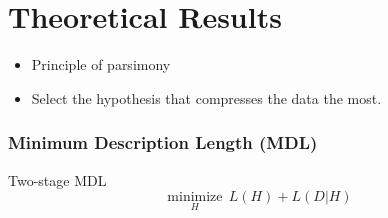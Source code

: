 \documentclass{beamer}
\begin{document}
% 

\section{Theoretical Results}


\begin{frame}
\begin{itemize}
\item Principle of parsimony
\item Select the hypothesis that compresses the data the most.
\end{itemize}
\frametitle{Minimum Description Length (MDL)}
\begin{block}{Two-stage MDL}
\begin{equation*}
\underset{H}{\text{minimize}} \ \ L(H) + L(D|H)
\end{equation*}
\end{block}
\end{frame}
\end{document}
